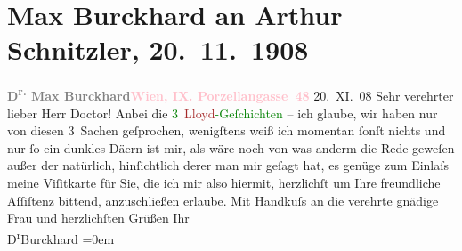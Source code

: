

               \section[Max Burckhard an Arthur Schnitzler, 20. 11. 1908]{ Max Burckhard an Arthur Schnitzler, 20. 11. 1908}\nopagebreak{}\rehead{ }\normalsize\beginnumbering{} \toendnotes[C]{\smallbreak\pagebreak[2]} 
\toendnotes[C]{\smallbreak}\pstart
           \noindent{}{\pb}\textcolor{gray}{\textbf{D\textsuperscript{r.} Max Burckhard}}\hfill \textcolor{gray}{\textbf{\textcolor{pink}{Wien, IX. Porzellangasse 48}{}\ledrightnote{\textcolor{pink}{Porzellangasse}}}}{ }20. XI. 08\pend
           \pstart
           \raggedleft{}\textcolor{gray}{\textbf{}}\hspace*{4em}\pend
           \pstart{}Sehr verehrter lieber Herr Doctor!\pend\pstart
           Anbei die \textcolor{green}{3 \textcolor{brown}{Lloyd}{}\ledrightnote{\textcolor{brown}{Pester Lloyd}}-Geſchichten}{} – ich glaube, wir
                    haben nur von diesen 3 Sachen geſprochen, wenigſtens weiß ich momentan ſonſt
                    nichts und nur ſo ein dunkles Dä{\geminationm}ern ist mir, als
                    wäre noch von was anderm die Rede geweſen außer der \label{K_L01807_1v}\label{K_L01807_1h}
                    natürlich, hinſichtlich derer man mir geſagt hat, es genüge zum Einlaſs meine
                    Viſitkarte für Sie, die ich mir also hiermit, herzlichſt um Ihre freundliche
                    Aſſiſtenz bittend, anzuschließen erlaube.\pend
           \pstart
           Mit Handkuſs an die verehrte gnädige Frau und herzlichſten Grüßen Ihr{\\[\baselineskip]}\spacefill\mbox{D\textsuperscript{r}Burckhard}\pend
           \leftskip=0em{}\endnumbering{}  
      